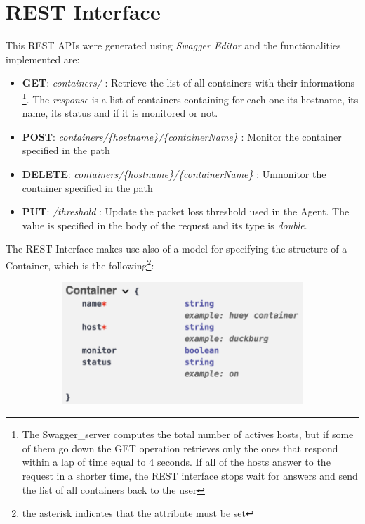 \section{REST Interface}
This REST APIs were generated using \textit{Swagger Editor} and the functionalities implemented are:

\begin{itemize}
	\item \textbf{GET}:
		\subitem \textit{containers/} : Retrieve the list of all containers with their informations \footnote{The Swagger\_server computes the total number of actives hosts, but if some of them go down the GET operation retrieves only the ones that respond within a lap of time equal to 4 seconds. If all of the hosts answer to the request in a shorter time, the REST interface stops wait for answers and send the list of all containers back to the user}. The \textit{response} is a list of containers containing for each one its hostname, its name, its status and if it is monitored or not.
	\item \textbf{POST}:
		\subitem \textit{containers/\{hostname\}/\{containerName\}} : Monitor the container specified in the path
	\item \textbf{DELETE}:
		\subitem \textit{containers/\{hostname\}/\{containerName\}} : Unmonitor the container specified in the path
	\item \textbf{PUT}:
		\subitem \textit{/threshold} : Update the packet loss threshold used in the Agent. The value is specified in the body of the request and its type is \textit{double}.
\end{itemize}

\noindent The REST Interface makes use also of a model for specifying the structure of a Container, which is the following\footnote{the asterisk indicates that the attribute must be set}:

\begin{figure}[H]
	\begin{subfigure}{\textwidth}
	\centering
		\includegraphics[width=0.9\linewidth]{img/container.png} 
	\end{subfigure}
\end{figure}